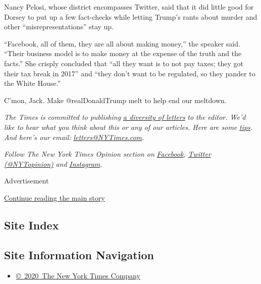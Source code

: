 Nancy Pelosi, whose district encompasses Twitter, said that it did
little good for Dorsey to put up a few fact-checks while letting Trump's
rants about murder and other ``misrepresentations'' stay up.

``Facebook, all of them, they are all about making money,'' the speaker
said. ``Their business model is to make money at the expense of the
truth and the facts.'' She crisply concluded that ``all they want is to
not pay taxes; they got their tax break in 2017'' and ``they don't want
to be regulated, so they pander to the White House.''

C'mon, Jack. Make @realDonaldTrump melt to help end our meltdown.

\emph{The Times is committed to publishing}
\href{https://www.nytimes3xbfgragh.onion/2019/01/31/opinion/letters/letters-to-editor-new-york-times-women.html}{\emph{a
diversity of letters}} \emph{to the editor. We'd like to hear what you
think about this or any of our articles. Here are some}
\href{https://help.nytimes3xbfgragh.onion/hc/en-us/articles/115014925288-How-to-submit-a-letter-to-the-editor}{\emph{tips}}\emph{.
And here's our email:}
\href{mailto:letters@NYTimes.com}{\emph{letters@NYTimes.com}}\emph{.}

\emph{Follow The New York Times Opinion section on}
\href{https://www.facebookcorewwwi.onion/nytopinion}{\emph{Facebook}}\emph{,}
\href{http://twitter.com/NYTOpinion}{\emph{Twitter (@NYTopinion)}}
\emph{and}
\href{https://www.instagram.com/nytopinion/}{\emph{Instagram}}\emph{.}

Advertisement

\protect\hyperlink{after-bottom}{Continue reading the main story}

\hypertarget{site-index}{%
\subsection{Site Index}\label{site-index}}

\hypertarget{site-information-navigation}{%
\subsection{Site Information
Navigation}\label{site-information-navigation}}

\begin{itemize}
\tightlist
\item
  \href{https://help.nytimes3xbfgragh.onion/hc/en-us/articles/115014792127-Copyright-notice}{©~2020~The
  New York Times Company}
\end{itemize}

